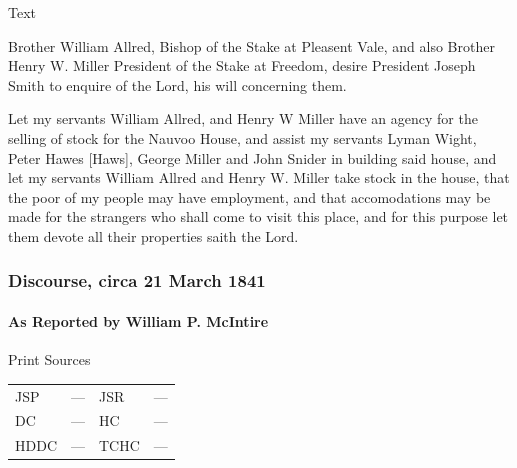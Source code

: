 			\begin{description}
				\item[Text]
			\end{description}
			

				Brother William Allred, Bishop of the Stake at Pleasent Vale, and also Brother Henry W. Miller President of the Stake at Freedom, desire President Joseph Smith to enquire of the Lord, his will concerning them.


				Let my servants William Allred, and Henry W Miller have an agency for the selling of stock for the Nauvoo House, and assist my servants Lyman Wight, Peter Hawes [Haws], George Miller and John Snider in building said house, and let my servants William Allred and Henry W. Miller take stock in the house, that the poor of my people may have employment, and that accomodations may be made for the strangers who shall come to visit this place, and for this purpose let them devote all their properties saith the Lord.
				
		\subsubsection{Discourse, circa 21 March 1841}
			\label{EMS-1841-JS-CIR-21-MAR-1841}
			
			\paragraph{As Reported by William P. McIntire}
				\label{EMS-1841-JS-CIR-21-MAR-1841-WM}
			
				\begin{description}
					\item[Print Sources]
				\end{description}

				\begin{tabular}{p{0.5in}p{1in}p{0.5in}p{1in}}
					JSP	 	& ---		& JSR 		& --- \\
					DC	 	& ---		& HC 		& --- \\
					HDDC 	& ---		& TCHC 		& --- \\
				\end{tabular}
				
